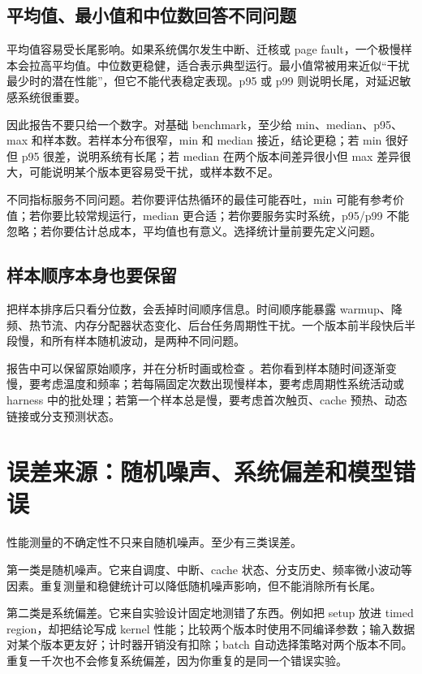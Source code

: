 \subsection{平均值、最小值和中位数回答不同问题}

平均值容易受长尾影响。如果系统偶尔发生中断、迁核或 page fault，一个极慢样本会拉高平均值。中位数更稳健，适合表示典型运行。最小值常被用来近似“干扰最少时的潜在性能”，但它不能代表稳定表现。p95 或 p99 则说明长尾，对延迟敏感系统很重要。

因此报告不要只给一个数字。对基础 benchmark，至少给 min、median、p95、max 和样本数。若样本分布很窄，min 和 median 接近，结论更稳；若 min 很好但 p95 很差，说明系统有长尾；若 median 在两个版本间差异很小但 max 差异很大，可能说明某个版本更容易受干扰，或样本数不足。

不同指标服务不同问题。若你要评估热循环的最佳可能吞吐，min 可能有参考价值；若你要比较常规运行，median 更合适；若你要服务实时系统，p95/p99 不能忽略；若你要估计总成本，平均值也有意义。选择统计量前要先定义问题。

\subsection{样本顺序本身也要保留}

把样本排序后只看分位数，会丢掉时间顺序信息。时间顺序能暴露 warmup、降频、热节流、内存分配器状态变化、后台任务周期性干扰。一个版本前半段快后半段慢，和所有样本随机波动，是两种不同问题。

报告中可以保留原始顺序，并在分析时画或检查 。若你看到样本随时间逐渐变慢，要考虑温度和频率；若每隔固定次数出现慢样本，要考虑周期性系统活动或 harness 中的批处理；若第一个样本总是慢，要考虑首次触页、cache 预热、动态链接或分支预测状态。

\section{误差来源：随机噪声、系统偏差和模型错误}

性能测量的不确定性不只来自随机噪声。至少有三类误差。

第一类是随机噪声。它来自调度、中断、cache 状态、分支历史、频率微小波动等因素。重复测量和稳健统计可以降低随机噪声影响，但不能消除所有长尾。

第二类是系统偏差。它来自实验设计固定地测错了东西。例如把 setup 放进 timed region，却把结论写成 kernel 性能；比较两个版本时使用不同编译参数；输入数据对某个版本更友好；计时器开销没有扣除；batch 自动选择策略对两个版本不同。重复一千次也不会修复系统偏差，因为你重复的是同一个错误实验。

